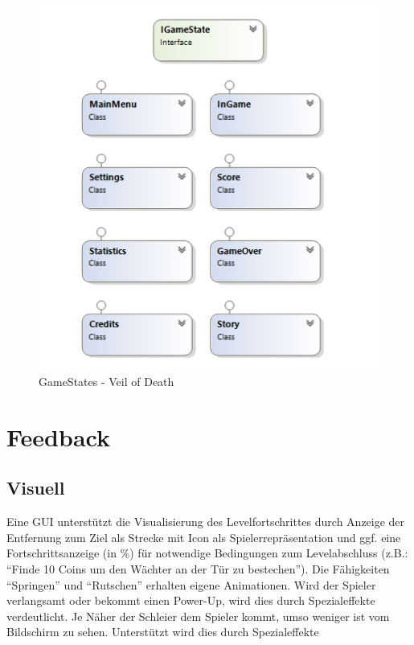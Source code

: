 \documentclass{article}
\begin{document}
\begin{figure}[H]
	\centering
	\includegraphics[width=1\textwidth]{gamestates}
	\caption{GameStates -  Veil of Death
		\label{fig:gamestates}}
\end{figure}

\vspace{1cm}
\section{Feedback}

\subsection{Visuell}
Eine GUI unterstützt die Visualisierung des Levelfortschrittes durch Anzeige der Entfernung
zum Ziel als Strecke mit Icon als Spielerrepräsentation und ggf. eine Fortschrittsanzeige (in \%) für notwendige Bedingungen zum Levelabschluss (z.B.: “Finde 10 Coins um den Wächter an der Tür zu bestechen”). \newline
Die Fähigkeiten “Springen” und “Rutschen” erhalten eigene Animationen. \newline
Wird der Spieler verlangsamt oder bekommt einen Power-Up, wird dies durch Spezialeffekte verdeutlicht. \newline
Je Näher der Schleier dem Spieler kommt, umso weniger ist vom Bildschirm zu sehen. Unterstützt wird dies durch Spezialeffekte
\end{document}
